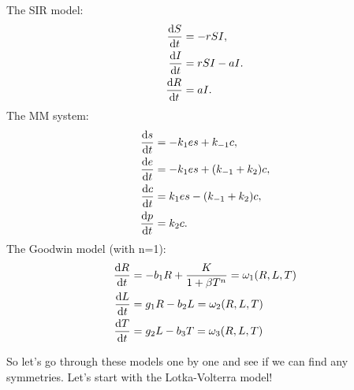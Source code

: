 The SIR model:
\begin{equation}
  \begin{split}
    \dv{S}{t}&=-rSI,\\
    \dv{I}{t}&=rSI-aI.\\
    \dv{R}{t}&=aI.\\    
    \end{split}
  \label{eq:Lorenz}
\end{equation}
The MM system:
\begin{equation}
  \begin{split}
    \dv{s}{t}&=-k_1 es+k_{-1}c,\\
    \dv{e}{t}&=-k_1 es+(k_{-1}+k_2)c,\\
    \dv{c}{t}&=k_1 es-(k_{-1}+k_2)c,\\
    \dv{p}{t}&=k_2 c.\\        
    \end{split}
  \label{eq:Lorenz}
\end{equation}
The Goodwin model (with n=1):
\begin{equation}
\begin{split}
  \dv{R}{t}&=-b_1 R+\dfrac{K}{1+\beta T^n}=\omega_1 (R,L,T)\\
  \dv{L}{t}&=g_1 R- b_2 L=\omega_2 (R,L,T)\\
    \dv{T}{t}&=g_2 L-b_3 T=\omega_3 (R,L,T)
\end{split}
  \label{eq:model}
\end{equation}

So let's go through these models one by one and see if we can find any symmetries. Let's start with the Lotka-Volterra model!